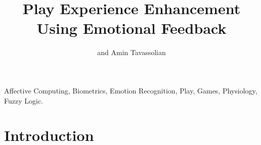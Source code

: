 \documentclass[conference]{IEEEtran}
\begin{document}

\title{Play Experience Enhancement Using Emotional Feedback}

\author{ and
Amin Tavassolian
}

\maketitle


\begin{abstract}
\label{sec:abs}
\end{abstract}

\begin{IEEEkeywords}
Affective Computing, Biometrics, Emotion Recognition, Play, Games, Physiology, Fuzzy Logic.
\end{IEEEkeywords}

\IEEEpeerreviewmaketitle


\section{Introduction}
\label{sec:intro}
\end{document}
